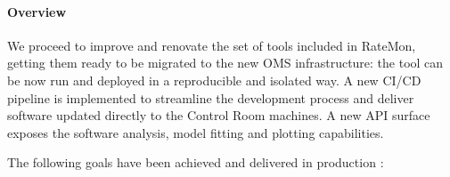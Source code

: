 \documentclass[a4, oneside, 10pt, nobib]{memoir}
\begin{document}
		\paragraph{Overview}

		We proceed to improve and renovate the set of tools included in RateMon, getting them ready to be migrated to the new OMS infrastructure: the tool can be now run and deployed in a reproducible and isolated way. A new CI/CD pipeline is implemented to streamline the development process and deliver software updated directly to the Control Room machines. A new API surface exposes the software analysis, model fitting and plotting capabilities.

		The following goals have been achieved and delivered in production \cite{VivaceRTM1} \cite{VivaceRTM2} \cite{L1TriggerOMSDevelopments} \cite{MohrmanRTM}:
\end{document}
